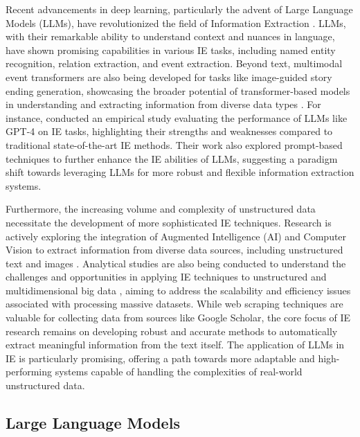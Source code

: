 Recent advancements in deep learning, particularly the advent of Large Language Models (LLMs), have revolutionized the field of Information Extraction \cite{CITE-IE-EMPIRICAL-LLM}. LLMs, with their remarkable ability to understand context and nuances in language, have shown promising capabilities in various IE tasks, including named entity recognition, relation extraction, and event extraction.  Beyond text, multimodal event transformers are also being developed for tasks like image-guided story ending generation, showcasing the broader potential of transformer-based models in understanding and extracting information from diverse data types \cite{zhou2023multimodal}. For instance, \cite{CITE-IE-EMPIRICAL-LLM} conducted an empirical study evaluating the performance of LLMs like GPT-4 on IE tasks, highlighting their strengths and weaknesses compared to traditional state-of-the-art IE methods. Their work also explored prompt-based techniques to further enhance the IE abilities of LLMs, suggesting a paradigm shift towards leveraging LLMs for more robust and flexible information extraction systems.

Furthermore, the increasing volume and complexity of unstructured data necessitate the development of more sophisticated IE techniques. Research is actively exploring the integration of Augmented Intelligence (AI) and Computer Vision to extract information from diverse data sources, including unstructured text and images \cite{CITE-IE-AUGMENTED-AI}. Analytical studies are also being conducted to understand the challenges and opportunities in applying IE techniques to unstructured and multidimensional big data \cite{CITE-IE-RESEARCHGATE}, aiming to address the scalability and efficiency issues associated with processing massive datasets. While web scraping techniques are valuable for collecting data from sources like Google Scholar, the core focus of IE research remains on developing robust and accurate methods to automatically extract meaningful information from the text itself. The application of LLMs in IE is particularly promising, offering a path towards more adaptable and high-performing systems capable of handling the complexities of real-world unstructured data.

\subsection{Large Language Models}

